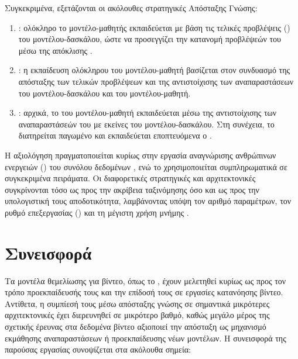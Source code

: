 Συγκεκριμένα, εξετάζονται οι ακόλουθες στρατηγικές Απόσταξης Γνώσης:
\begin{enumerate}
    \item \textbf{}: ολόκληρο το
    μοντέλο-μαθητής εκπαιδεύεται με βάση τις τελικές προβλέψεις
    () του μοντέλου-δασκάλου, ώστε να προσεγγίζει την κατανομή
    προβλέψεών του μέσω της απόκλισης .

    \item \textbf{}: η
    εκπαίδευση ολόκληρου του μοντέλου-μαθητή βασίζεται στον συνδυασμό της
    απόσταξης των τελικών προβλέψεων και της αντιστοίχισης των αναπαραστάσεων
    του μοντέλου-δασκάλου και του μοντέλου-μαθητή.

    \item \textbf{}: 
    αρχικά, το  του
    μοντέλου-μαθητή εκπαιδεύεται μέσω της αντιστοίχισης των αναπαραστάσεών
    του με εκείνες του μοντέλου-δασκάλου. Στη συνέχεια, το
     διατηρείται παγωμένο και εκπαιδεύεται εποπτευόμενα ο
    .
\end{enumerate}

Η αξιολόγηση πραγματοποιείται κυρίως στην εργασία αναγνώρισης ανθρώπινων ενεργειών
() του συνόλου δεδομένων , ενώ το
 χρησιμοποιείται συμπληρωματικά σε συγκεκριμένα πειράματα. Οι
διαφορετικές στρατηγικές και αρχιτεκτονικές συγκρίνονται τόσο ως προς την
ακρίβεια ταξινόμησης όσο και ως προς την υπολογιστική τους αποδοτικότητα,
λαμβάνοντας υπόψη τον αριθμό παραμέτρων, τον ρυθμό επεξεργασίας () και τη
μέγιστη χρήση μνήμης .


\section{Συνεισφορά}
\label{sec:intro-contribution}

Τα μοντέλα θεμελίωσης για βίντεο, όπως το , έχουν μελετηθεί
κυρίως ως προς τον τρόπο προεκπαίδευσής τους και την επίδοσή τους σε
εργασίες κατανόησης βίντεο. Αντίθετα, η συμπίεσή τους μέσω απόσταξης
γνώσης σε σημαντικά μικρότερες αρχιτεκτονικές έχει διερευνηθεί σε
μικρότερο βαθμό, καθώς μεγάλο μέρος της σχετικής έρευνας στα δεδομένα
βίντεο αξιοποιεί την απόσταξη ως μηχανισμό εκμάθησης αναπαραστάσεων ή
προεκπαίδευσης νέων μοντέλων. Η συνεισφορά της παρούσας εργασίας
συνοψίζεται στα ακόλουθα σημεία:

